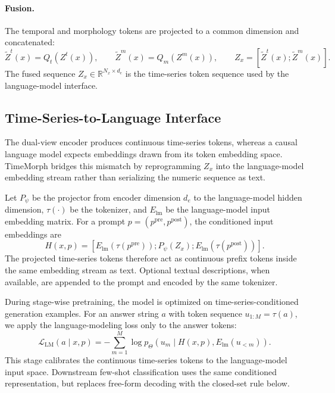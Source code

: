 \documentclass{article}
\begin{document}
\paragraph{Fusion.}
The temporal and morphology tokens are projected to a common dimension and
concatenated:
\begin{equation}
\label{eq:dual-view-fusion}
\tilde{Z}^{t}(x)=Q_t(Z^{t}(x)),
\qquad
\tilde{Z}^{m}(x)=Q_m(Z^{m}(x)),
\qquad
Z_x=
\left[
\tilde{Z}^{t}(x);
\tilde{Z}^{m}(x)
\right].
\end{equation}
The fused sequence $Z_x\in\mathbb{R}^{N_x\times d_e}$ is the time-series token
sequence used by the language-model interface.

\subsection{Time-Series-to-Language Interface}
\label{sec:ts-token-conditioning}

The dual-view encoder produces continuous time-series tokens, whereas a causal
language model expects embeddings drawn from its token embedding space. TimeMorph
bridges this mismatch by reprogramming $Z_x$ into the language-model embedding
stream rather than serializing the numeric sequence as text.

Let $P_\psi$ be the projector from encoder dimension $d_e$ to the language-model
hidden dimension, $\tau(\cdot)$ be the tokenizer, and $E_{\mathrm{lm}}$ be the
language-model input embedding matrix. For a prompt
$p=(p^{\mathrm{pre}},p^{\mathrm{post}})$, the conditioned input embeddings are
\begin{equation}
\label{eq:conditioned-input}
H(x,p)=
\left[
E_{\mathrm{lm}}(\tau(p^{\mathrm{pre}}));
P_{\psi}(Z_x);
E_{\mathrm{lm}}(\tau(p^{\mathrm{post}}))
\right].
\end{equation}
The projected time-series tokens therefore act as continuous prefix tokens inside
the same embedding stream as text. Optional textual descriptions, when available,
are appended to the prompt and encoded by the same tokenizer.

During stage-wise pretraining, the model is optimized on time-series-conditioned
generation examples. For an answer string $a$ with token sequence
$u_{1:M}=\tau(a)$, we apply the language-modeling loss only to the answer tokens:
\begin{equation}
\label{eq:answer-lm}
\mathcal{L}_{\mathrm{LM}}(a\mid x,p)
=
-\sum_{m=1}^{M}
\log p_{\Theta}
\left(
 u_m
 \mid
 H(x,p), E_{\mathrm{lm}}(u_{<m})
\right).
\end{equation}
This stage calibrates the continuous time-series tokens to the language-model
input space. Downstream few-shot classification uses the same conditioned
representation, but replaces free-form decoding with the closed-set rule below.
\end{document}
